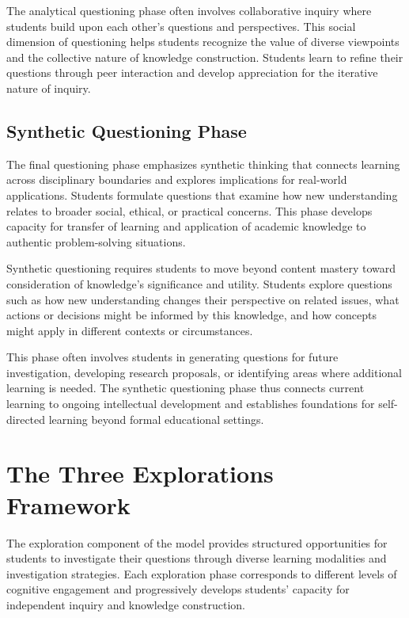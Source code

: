 \documentclass[
  Letterpaper,
]{scrbook}
\begin{document}
The analytical questioning phase often involves collaborative inquiry
where students build upon each other's questions and perspectives. This
social dimension of questioning helps students recognize the value of
diverse viewpoints and the collective nature of knowledge construction.
Students learn to refine their questions through peer interaction and
develop appreciation for the iterative nature of inquiry.

\subsection{Synthetic Questioning
Phase}\label{synthetic-questioning-phase}

The final questioning phase emphasizes synthetic thinking that connects
learning across disciplinary boundaries and explores implications for
real-world applications. Students formulate questions that examine how
new understanding relates to broader social, ethical, or practical
concerns. This phase develops capacity for transfer of learning and
application of academic knowledge to authentic problem-solving
situations.

Synthetic questioning requires students to move beyond content mastery
toward consideration of knowledge's significance and utility. Students
explore questions such as how new understanding changes their
perspective on related issues, what actions or decisions might be
informed by this knowledge, and how concepts might apply in different
contexts or circumstances.

This phase often involves students in generating questions for future
investigation, developing research proposals, or identifying areas where
additional learning is needed. The synthetic questioning phase thus
connects current learning to ongoing intellectual development and
establishes foundations for self-directed learning beyond formal
educational settings.

\section{The Three Explorations
Framework}\label{the-three-explorations-framework}

The exploration component of the model provides structured opportunities
for students to investigate their questions through diverse learning
modalities and investigation strategies. Each exploration phase
corresponds to different levels of cognitive engagement and
progressively develops students' capacity for independent inquiry and
knowledge construction.
\end{document}
